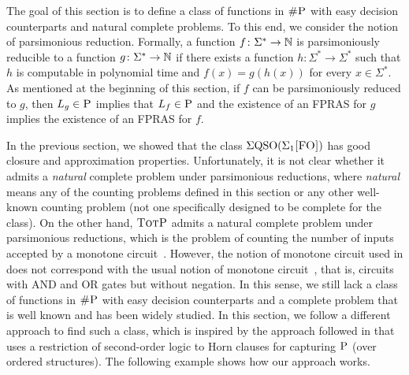 \newcommand{\pP}{\textit{P}}
\newcommand{\pN}{\textit{N}}
\newcommand{\pV}{\textit{V}}
\newcommand{\pT}{\textit{T}}
\newcommand{\pA}{\textit{A}}
\newcommand{\pNC}{\textit{NC}}
\newcommand{\pD}{\textit{D}}




The goal of this section is to define a class of functions in $\text{\sc \#P}$ with easy decision counterparts and natural complete problems. To this end, we consider the notion of parsimonious reduction. Formally, a function $f\colon\Sigma^* \to \mathbb{N}$ is parsimoniously reducible to a function $g\colon\Sigma^* \to \mathbb{N}$ if there exists a function $h\colon\Sigma^* \to \Sigma^*$ such that $h$ is computable in polynomial time and $f(x) = g(h(x))$ for every $x \in \Sigma^*$. As mentioned at the beginning of this section, if $f$ can be parsimoniously reduced to $g$, then $L_g \in \text{\sc P}$ implies that $L_f \in \text{\sc P}$ and the existence of an FPRAS for $g$ implies the existence of an FPRAS for $f$. 

In the previous section, we showed that the class $\Sigma{\rm QSO}(\Sigma_{1}\textsc{[FO]})$ has good closure and approximation properties. Unfortunately, it is not clear whether it admits a {\em natural} complete problem under parsimonious reductions, where {\em natural} means any of the counting problems defined in this section or any other well-known counting problem (not one specifically designed to be complete for the class). On the other hand, $\text{\sc TotP}$ admits a natural complete problem under parsimonious reductions, which is the problem of counting the number of inputs accepted by a monotone circuit~\cite{BCPPZ17}. However, the notion of monotone circuit used in \cite{BCPPZ17} does not correspond with the usual notion of monotone circuit~\cite{GS90}, that is, circuits with AND and OR gates but without negation. In this sense, we still lack a class of functions in $\text{\sc \#P}$ with easy decision counterparts and a complete problem that is well known and has been widely studied. In this section, we follow a different approach to find such a class,
which is inspired by the approach followed in \cite{G92} that uses a restriction of second-order logic to Horn clauses for capturing $\text{\sc P}$ (over ordered structures). The following example shows how our approach works.

